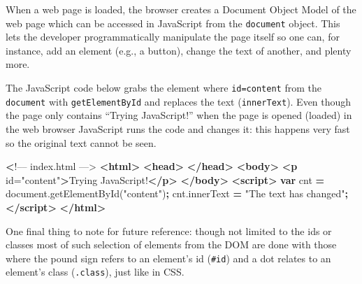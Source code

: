 \documentclass[
]{krantz}
\makeatletter
\newenvironment{Shaded}{\begin{snugshade}}{\end{snugshade}}
\newcommand{\AttributeTok}[1]{\textcolor[rgb]{0.61,0.61,0.61}{#1}}
\newcommand{\ErrorTok}[1]{\textcolor[rgb]{0.14,0.14,0.14}{\textbf{#1}}}
\newcommand{\KeywordTok}[1]{\textcolor[rgb]{0.27,0.27,0.27}{\textbf{#1}}}
\newcommand{\NormalTok}[1]{#1}
\newcommand{\OperatorTok}[1]{\textcolor[rgb]{0.43,0.43,0.43}{\textbf{#1}}}
\newcommand{\OtherTok}[1]{\textcolor[rgb]{0.37,0.37,0.37}{#1}}
\newcommand{\StringTok}[1]{\textcolor[rgb]{0.5,0.5,0.5}{#1}}
\newcommand{\VariableTok}[1]{\textcolor[rgb]{0,0,0}{#1}}
\newenvironment{kframe}{%
\medskip{}
\setlength{\fboxsep}{.8em}
 \def\at@end@of@kframe{}%
 \ifinner\ifhmode%
  \def\at@end@of@kframe{\end{minipage}}%
  \begin{minipage}{\columnwidth}%
 \fi\fi%
 \def\FrameCommand##1{\hskip\@totalleftmargin \hskip-\fboxsep
 \colorbox{shadecolor}{##1}\hskip-\fboxsep
     \hskip-\linewidth \hskip-\@totalleftmargin \hskip\columnwidth}%
 \MakeFramed {\advance\hsize-\width
   \@totalleftmargin\z@ \linewidth\hsize
   \@setminipage}}%
 {\par\unskip\endMakeFramed%
 \at@end@of@kframe}
\renewenvironment{Shaded}{\begin{kframe}}{\end{kframe}}
\makeatother
\begin{document}
When a web page is loaded, the browser creates a Document Object Model of the web page which can be accessed in JavaScript from the \texttt{document} object. This lets the developer programmatically manipulate the page itself so one can, for instance, add an element (e.g., a button), change the text of another, and plenty more.

The JavaScript code below grabs the element where \texttt{id=\textquotesingle{}content\textquotesingle{}} from the \texttt{document} with \texttt{getElementById} and replaces the text (\texttt{innerText}). Even though the page only contains ``Trying JavaScript!'' when the page is opened (loaded) in the web browser JavaScript runs the code and changes it: this happens very fast so the original text cannot be seen.

\begin{Shaded}
\begin{Highlighting}[]
 \ErrorTok{<}\NormalTok{!–– index.html ––>}
\KeywordTok{<html>}
  \KeywordTok{<head>}
  \KeywordTok{</head>}
  \KeywordTok{<body>}
    \KeywordTok{<p}\OtherTok{ id=}\StringTok{"content"}\KeywordTok{>}\NormalTok{Trying JavaScript!}\KeywordTok{</p>}
  \KeywordTok{</body>}
  \KeywordTok{<script>}
    \KeywordTok{var}\NormalTok{ cnt }\OperatorTok{=} \VariableTok{document}\NormalTok{.}\AttributeTok{getElementById}\NormalTok{(}\StringTok{"content"}\NormalTok{)}\OperatorTok{;}
    \VariableTok{cnt}\NormalTok{.}\AttributeTok{innerText} \OperatorTok{=} \StringTok{"The text has changed"}\OperatorTok{;}
  \KeywordTok{</script>}
\KeywordTok{</html>}
\end{Highlighting}
\end{Shaded}

One final thing to note for future reference: though not limited to the ids or classes most of such selection of elements from the DOM are done with those where the pound sign refers to an element's id (\texttt{\#id}) and a dot relates to an element's class (\texttt{.class}), just like in CSS.
\end{document}
